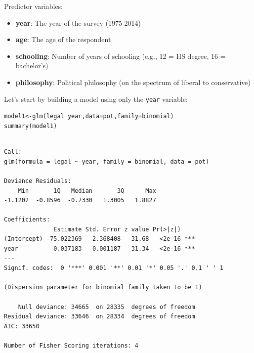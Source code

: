 \documentclass{beamer}\usepackage[]{graphicx}\usepackage[]{color}
\makeatletter
\newcommand{\hlopt}[1]{\textcolor[rgb]{1,0.894,0.769}{#1}}%
\newcommand{\hlstd}[1]{\textcolor[rgb]{1,0.894,0.769}{#1}}%
\newcommand{\hlkwb}[1]{\textcolor[rgb]{0.804,0.776,0.451}{#1}}%
\newcommand{\hlkwc}[1]{\textcolor[rgb]{0.78,0.941,0.545}{#1}}%
\newcommand{\hlkwd}[1]{\textcolor[rgb]{1,0.78,0.769}{#1}}%
\newenvironment{kframe}{%
 \def\at@end@of@kframe{}%
 \ifinner\ifhmode%
  \def\at@end@of@kframe{\end{minipage}}%
  \begin{minipage}{\columnwidth}%
 \fi\fi%
 \def\FrameCommand##1{\hskip\@totalleftmargin \hskip-\fboxsep
 \colorbox{shadecolor}{##1}\hskip-\fboxsep
     \hskip-\linewidth \hskip-\@totalleftmargin \hskip\columnwidth}%
 \MakeFramed {\advance\hsize-\width
   \@totalleftmargin\z@ \linewidth\hsize
   \@setminipage}}%
 {\par\unskip\endMakeFramed%
 \at@end@of@kframe}
\newenvironment{knitrout}{}{} %
\makeatother
\begin{document}
\begin{darkframes}
\begin{frame}
      \pause
      Predictor variables:
      \begin{itemize}
        \item \textbf{year}: The year of the survey (1975-2014)
        \item \textbf{age}: The age of the respondent
        \item \textbf{schooling}: Number of years of schooling (e.g., 12 = HS degree, 16 = bachelor's)
        \item \textbf{philosophy}: Political philosophy (on the spectrum of liberal to conservative)
      \end{itemize}
    \end{frame}

    \begin{frame}[fragile]
      Let's start by building a model using only the \texttt{year} variable:
      \fontsize{8}{8}\selectfont
\begin{knitrout}
\begin{kframe}
\begin{alltt}
\hlstd{model1} \hlkwb{<-} \hlkwd{glm}\hlstd{(legal} \hlopt{~} \hlstd{year,} \hlkwc{data}\hlstd{=pot,} \hlkwc{family}\hlstd{=binomial)}
\hlkwd{summary}\hlstd{(model1)}
\end{alltt}
\begin{verbatim}

Call:
glm(formula = legal ~ year, family = binomial, data = pot)

Deviance Residuals: 
    Min       1Q   Median       3Q      Max  
-1.1202  -0.8596  -0.7330   1.3005   1.8827  

Coefficients:
              Estimate Std. Error z value Pr(>|z|)    
(Intercept) -75.022369   2.368408  -31.68   <2e-16 ***
year          0.037183   0.001187   31.34   <2e-16 ***
---
Signif. codes:  0 '***' 0.001 '**' 0.01 '*' 0.05 '.' 0.1 ' ' 1

(Dispersion parameter for binomial family taken to be 1)

    Null deviance: 34665  on 28335  degrees of freedom
Residual deviance: 33646  on 28334  degrees of freedom
AIC: 33650

Number of Fisher Scoring iterations: 4
\end{verbatim}
\end{kframe}
\end{knitrout}
    \end{frame}


\end{darkframes}
\end{document}
